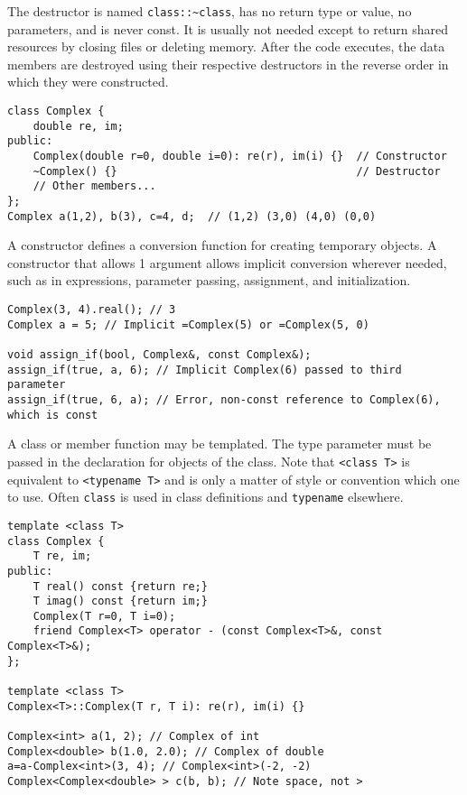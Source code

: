 		The destructor is named \lstinline!class::~class!, has no return type or value, no parameters, and is never const. It is usually not needed except to return shared resources by closing files or deleting memory. After the code executes, the data members are destroyed using their respective destructors in the reverse order in which they were constructed.
		
		\begin{code}\begin{lstlisting}[style=list]
class Complex {
	double re, im;
public:
	Complex(double r=0, double i=0): re(r), im(i) {}  // Constructor
	~Complex() {}                                     // Destructor
	// Other members...
};
Complex a(1,2), b(3), c=4, d;  // (1,2) (3,0) (4,0) (0,0)
	  \end{lstlisting}\end{code}
		
		A constructor defines a conversion function for creating temporary objects. A constructor that allows 1 argument allows implicit conversion wherever needed, such as in expressions, parameter passing, assignment, and initialization.
		\begin{code}\begin{lstlisting}[style=list]
Complex(3, 4).real(); // 3
Complex a = 5; // Implicit =Complex(5) or =Complex(5, 0)

void assign_if(bool, Complex&, const Complex&);
assign_if(true, a, 6); // Implicit Complex(6) passed to third parameter
assign_if(true, 6, a); // Error, non-const reference to Complex(6), which is const
		\end{lstlisting}\end{code}
		
		A class or member function may be templated. The type parameter must be passed in the declaration for objects of the class. Note that \lstinline!<class T>! is equivalent to \lstinline!<typename T>! and is only a matter of style or convention which one to use. Often \lstinline!class! is used in class definitions and \lstinline!typename! elsewhere.
		\begin{code}\begin{lstlisting}[style=list]
template <class T>
class Complex {
	T re, im;
public:
	T real() const {return re;}
	T imag() const {return im;}
	Complex(T r=0, T i=0);
	friend Complex<T> operator - (const Complex<T>&, const Complex<T>&);
};

template <class T>
Complex<T>::Complex(T r, T i): re(r), im(i) {}

Complex<int> a(1, 2); // Complex of int
Complex<double> b(1.0, 2.0); // Complex of double
a=a-Complex<int>(3, 4); // Complex<int>(-2, -2)
Complex<Complex<double> > c(b, b); // Note space, not >
		\end{lstlisting}\end{code}
		
